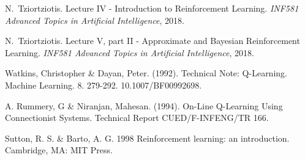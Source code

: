 \documentclass[journal, a4paper]{IEEEtran}
\begin{document}
\begin{thebibliography}{4}

	N.~Tziortziotis. Lecture IV - Introduction to Reinforcement Learning. \textit{INF581 Advanced Topics in Artificial Intelligence}, 2018.

	N.~Tziortziotis. Lecture V, part II - Approximate and Bayesian Reinforcement Learning. \textit{INF581 Advanced Topics in Artificial Intelligence}, 2018.

	Watkins, Christopher \& Dayan, Peter. (1992). Technical Note: Q-Learning. Machine Learning. 8. 279-292. 10.1007/BF00992698. 

	A. Rummery, G \& Niranjan, Mahesan. (1994). On-Line Q-Learning Using Connectionist Systems. Technical Report CUED/F-INFENG/TR 166. 

    Sutton, R. S. \& Barto, A. G. 1998 Reinforcement learning: an introduction. Cambridge, MA: MIT Press.

\end{thebibliography}
\end{document}
